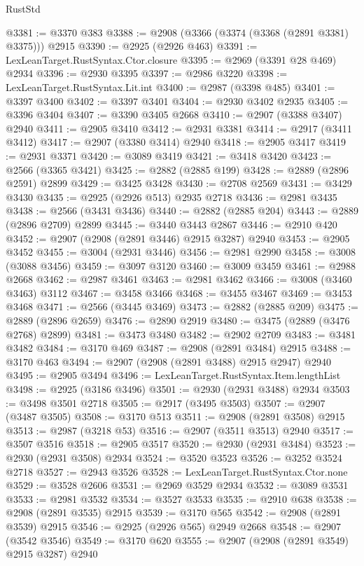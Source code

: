 \begin{lexlean}{RustStd}
\begin{coremodule}
@3381 := @3370 @383
@3388 := @2908 (@3366 (@3374 (@3368 (@2891 @3381) @3375))) @2915
@3390 := @2925 (@2926 @463)
@3391 := LexLeanTarget.RustSyntax.Ctor.closure
@3395 := @2969 (@3391 @28 @469) @2934
@3396 := @2930 @3395
@3397 := @2986 @3220
@3398 := LexLeanTarget.RustSyntax.Lit.int
@3400 := @2987 (@3398 @485)
@3401 := @3397 @3400
@3402 := @3397 @3401
@3404 := @2930 @3402 @2935
@3405 := @3396 @3404
@3407 := @3390 @3405 @2668
@3410 := @2907 (@3388 @3407) @2940
@3411 := @2905 @3410
@3412 := @2931 @3381
@3414 := @2917 (@3411 @3412)
@3417 := @2907 (@3380 @3414) @2940
@3418 := @2905 @3417
@3419 := @2931 @3371
@3420 := @3089 @3419
@3421 := @3418 @3420
@3423 := @2566 (@3365 @3421)
@3425 := @2882 (@2885 @199)
@3428 := @2889 (@2896 @2591) @2899
@3429 := @3425 @3428
@3430 := @2708 @2569
@3431 := @3429 @3430
@3435 := @2925 (@2926 @513) @2935 @2718
@3436 := @2981 @3435
@3438 := @2566 (@3431 @3436)
@3440 := @2882 (@2885 @204)
@3443 := @2889 (@2896 @2709) @2899
@3445 := @3440 @3443 @2867
@3446 := @2910 @420
@3452 := @2907 (@2908 (@2891 @3446) @2915 @3287) @2940
@3453 := @2905 @3452
@3455 := @3004 (@2931 @3446)
@3456 := @2981 @2990
@3458 := @3008 (@3088 @3456)
@3459 := @3097 @3120
@3460 := @3009 @3459
@3461 := @2988 @2668
@3462 := @2987 @3461
@3463 := @2981 @3462
@3466 := @3008 (@3460 @3463) @3112
@3467 := @3458 @3466
@3468 := @3455 @3467
@3469 := @3453 @3468
@3471 := @2566 (@3445 @3469)
@3473 := @2882 (@2885 @209)
@3475 := @2889 (@2896 @2659)
@3476 := @2890 @2919
@3480 := @3475 (@2889 (@3476 @2768) @2899)
@3481 := @3473 @3480
@3482 := @2902 @2709
@3483 := @3481 @3482
@3484 := @3170 @469
@3487 := @2908 (@2891 @3484) @2915
@3488 := @3170 @463
@3494 := @2907 (@2908 (@2891 @3488) @2915 @2947) @2940
@3495 := @2905 @3494
@3496 := LexLeanTarget.RustSyntax.Item.lengthList
@3498 := @2925 (@3186 @3496)
@3501 := @2930 (@2931 @3488) @2934
@3503 := @3498 @3501 @2718
@3505 := @2917 (@3495 @3503)
@3507 := @2907 (@3487 @3505)
@3508 := @3170 @513
@3511 := @2908 (@2891 @3508) @2915
@3513 := @2987 (@3218 @53)
@3516 := @2907 (@3511 @3513) @2940
@3517 := @3507 @3516
@3518 := @2905 @3517
@3520 := @2930 (@2931 @3484)
@3523 := @2930 (@2931 @3508) @2934
@3524 := @3520 @3523
@3526 := @3252 @3524 @2718
@3527 := @2943 @3526
@3528 := LexLeanTarget.RustSyntax.Ctor.none
@3529 := @3528 @2606
@3531 := @2969 @3529 @2934
@3532 := @3089 @3531
@3533 := @2981 @3532
@3534 := @3527 @3533
@3535 := @2910 @638
@3538 := @2908 (@2891 @3535) @2915
@3539 := @3170 @565
@3542 := @2908 (@2891 @3539) @2915
@3546 := @2925 (@2926 @565) @2949 @2668
@3548 := @2907 (@3542 @3546)
@3549 := @3170 @620
@3555 := @2907 (@2908 (@2891 @3549) @2915 @3287) @2940

\end{coremodule}
\end{lexlean}
